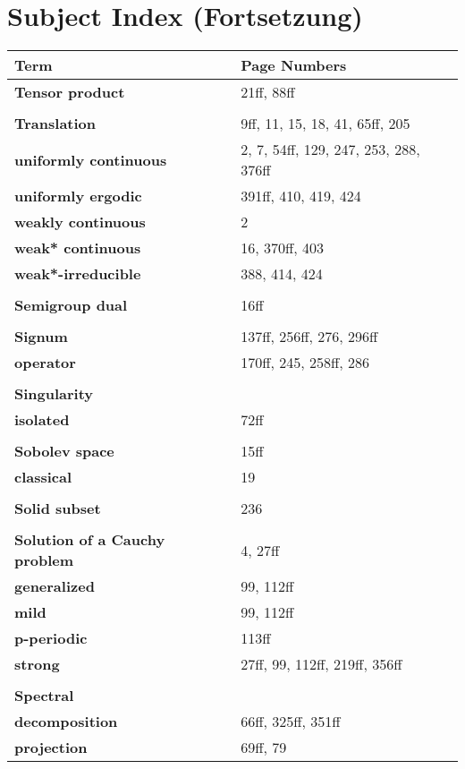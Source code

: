\documentclass[10pt]{scrartcl}
\begin{document}
\section*{Subject Index (Fortsetzung)}

\begin{longtable}{>{\bfseries}p{6cm}p{8cm}}
\textbf{Term} & \textbf{Page Numbers} \\
\hline
\endhead

\textbf{Tensor product} & 21ff, 88ff \\
\\
\textbf{Translation} & 9ff, 11, 15, 18, 41, 65ff, 205 \\
\quad uniformly continuous & 2, 7, 54ff, 129, 247, 253, 288, 376ff \\
\quad uniformly ergodic & 391ff, 410, 419, 424 \\
\quad weakly continuous & 2 \\
\quad weak* continuous & 16, 370ff, 403 \\
\quad weak*-irreducible & 388, 414, 424 \\
\\
\textbf{Semigroup dual} & 16ff \\
\\
\textbf{Signum} & 137ff, 256ff, 276, 296ff \\
\quad operator & 170ff, 245, 258ff, 286 \\
\\
\textbf{Singularity} & \\
\quad isolated & 72ff \\
\\
\textbf{Sobolev space} & 15ff \\
\quad classical & 19 \\
\\
\textbf{Solid subset} & 236 \\
\\
\textbf{Solution of a Cauchy problem} & 4, 27ff \\
\quad generalized & 99, 112ff \\
\quad mild & 99, 112ff \\
\quad p-periodic & 113ff \\
\quad strong & 27ff, 99, 112ff, 219ff, 356ff \\
\\
\textbf{Spectral} & \\
\quad decomposition & 66ff, 325ff, 351ff \\
\quad projection & 69ff, 79 \\

\end{longtable}
\end{document}
